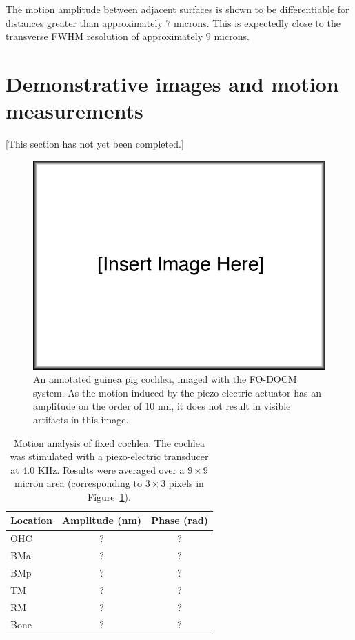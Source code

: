 The motion amplitude between adjacent surfaces is shown to be differentiable for distances greater than approximately $7$ microns. This is expectedly close to the transverse FWHM resolution of approximately $9$ microns.

\section{Demonstrative images and motion measurements}

[This section has not yet been completed.]

\begin{figure}[h!]
\centering
\includegraphics[width=1.0\textwidth]{Images/missing.png}
\caption[An annotated guinea pig cochlea, imaged with the FO-DOCM system.]{An annotated guinea pig cochlea, imaged with the FO-DOCM system. As the motion induced by the piezo-electric actuator has an amplitude on the order of 10 nm, it does not result in visible artifacts in this image. \label{fig:cochlea_image}}
\end{figure}

\begin{table}[h!]
\centering
\begin{tabular}{l | c c}
Location & Amplitude (nm) & Phase (rad) \\ \hline
OHC & ? & ? \\
BMa & ? & ? \\
BMp & ? & ? \\
TM & ? & ? \\
RM & ? & ? \\
Bone & ? & ? \\
\end{tabular}
\caption[Motion analysis of fixed cochlea.]{Motion analysis of fixed cochlea. The cochlea was stimulated with a piezo-electric transducer at 4.0 KHz. Results were averaged over a $9 \times 9$ micron area (corresponding to $3 \times 3$ pixels in Figure~\ref{fig:cochlea_image}). \label{tab:cochlea_vib}}
\end{table}

